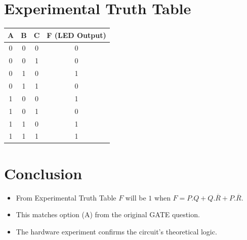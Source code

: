 \documentclass[a4paper,12pt]{article}
\begin{document}
\section*{Experimental Truth Table}
\begin{table}[H]
\centering
\begin{tabular}{|c|c|c|c|}
\hline
A & B & C & F (LED Output) \\ \hline
0 & 0 & 0 & 0 \\
0 & 0 & 1 & 0 \\
0 & 1 & 0 & 1 \\
0 & 1 & 1 & 0 \\
1 & 0 & 0 & 1 \\
1 & 0 & 1 & 0 \\
1 & 1 & 0 & 1 \\
1 & 1 & 1 & 1 \\
\hline
\end{tabular}
\end{table}
\section*{Conclusion}
\begin{itemize}
    	\item From Experimental Truth Table $F$ will be $1$ when $F=P.Q+Q.\overline{R}+P.\overline{R}$. 
	\item This matches option (A) from the original GATE question.
    	\item The hardware experiment confirms the circuit's theoretical logic.
\end{itemize}
\end{document}
